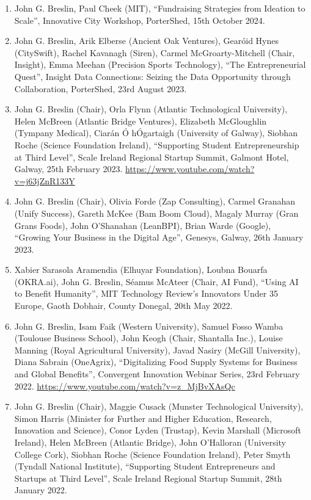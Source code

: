 \documentclass[10pt,a4paper]{res} %
\begin{document}
\begin{resume}
\begin{enumerate} \itemsep -2pt
\item John G. Breslin, Paul Cheek (MIT), ``Fundraising Strategies from Ideation to Scale'', Innovative City Workshop, PorterShed, 15th October 2024.
\item John G. Breslin, Arik Elberse (Ancient Oak Ventures), Gear\'{o}id Hynes (CitySwift), Rachel Kavanagh (Siren), Carmel McGroarty-Mitchell (Chair, Insight), Emma Meehan (Precision Sports Technology), ``The Entrepreneurial Quest'', Insight Data Connections: Seizing the Data Opportunity through Collaboration, PorterShed, 23rd August 2023.
\item John G. Breslin (Chair), Orla Flynn (Atlantic Technological University), Helen McBreen (Atlantic Bridge Ventures), Elizabeth McGloughlin (Tympany Medical), Ciar\'{a}n \'{O} h\'{O}gartaigh (University of Galway), Siobhan Roche (Science Foundation Ireland), ``Supporting Student Entrepreneurship at Third Level'', Scale Ireland Regional Startup Summit, Galmont Hotel, Galway, 25th February 2023. \url{https://www.youtube.com/watch?v=j63jZnR133Y}
\item John G. Breslin (Chair), Olivia Forde (Zap Consulting), Carmel Granahan (Unify Success), Gareth McKee (Bam Boom Cloud), Magaly Murray (Gran Grans Foods), John O'Shanahan (LeanBPI), Brian Warde (Google), ``Growing Your Business in the Digital Age'', Genesys, Galway, 26th January 2023.
\item Xabier Sarasola Aramendia (Elhuyar Foundation), Loubna Bouarfa (OKRA.ai), John G. Breslin, S\'{e}amus McAteer (Chair, AI Fund), ``Using AI to Benefit Humanity'', MIT Technology Review's Innovators Under 35 Europe, Gaoth Dobhair, County Donegal, 20th May 2022. %
\item John G. Breslin, Isam Faik (Western University), Samuel Fosso Wamba (Toulouse Business School), John Keogh (Chair, Shantalla Inc.), Louise Manning (Royal Agricultural University), Javad Nasiry (McGill University), Diana Sabrain (OneAgrix), ``Digitalizing Food Supply Systems for Business and Global Benefits'', Convergent Innovation Webinar Series, 23rd February 2022. \url{https://www.youtube.com/watch?v=z_MjBvXAsQc} %
\item John G. Breslin (Chair), Maggie Cusack (Munster Technological University), Simon Harris (Minister for Further and Higher Education, Research, Innovation and Science), Conor Lyden (Trustap), Kevin Marshall (Microsoft Ireland), Helen McBreen (Atlantic Bridge), John O'Halloran (University College Cork), Siobhan Roche (Science Foundation Ireland), Peter Smyth (Tyndall National Institute), ``Supporting Student Entrepreneurs and Startups at Third Level'', Scale Ireland Regional Startup Summit, 28th January 2022.

\end{enumerate}
\end{resume}
\end{document}
